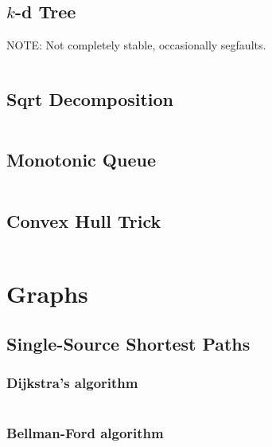 \documentclass[9pt,a4paper,twocolumn,landscape,oneside]{amsart}
\newcommand{\code}[1]{\inputminted{cpp}{_code/#1}}
\newif\ifverbose
\begin{document}
    \subsection{$k$-d Tree}
        \ifverbose
        A $k$-dimensional tree supporting fast construction, adding points, and
        nearest neighbor queries.
        \fi
        NOTE: Not completely stable, occasionally segfaults.
        \code{data-structures/kd_tree.cpp}

    \subsection{Sqrt Decomposition}
        \ifverbose
        Design principle that supports many operations in amortized $\sqrt{n}$ per operation.
        \fi
        \code{data-structures/sqrt_decomposition.cpp}

    \subsection{Monotonic Queue}
        \ifverbose
        A queue that supports querying for the minimum element. Useful for sliding window algorithms.
        \fi
        \code{data-structures/monotonic_queue.cpp}

    \subsection{Convex Hull Trick}
        \code{data-structures/convex_hull_trick.cpp}

\section{Graphs}
    \subsection{Single-Source Shortest Paths}
        \subsubsection{Dijkstra's algorithm}
            \ifverbose
            An implementation of Dijkstra's algorithm. It runs in
            $\Theta(|E|\log{|V|})$ time.
            \fi
            \code{graph/dijkstra.cpp}

        \subsubsection{Bellman-Ford algorithm}
            \ifverbose
            The Bellman-Ford algorithm solves the single-source shortest paths
            problem in $O(|V||E|)$ time. It is slower than Dijkstra's
            algorithm, but it works on graphs with negative edges and has the
            ability to detect negative cycles, neither of which Dijkstra's
            algorithm can do.
            \fi
            \code{graph/bellman_ford.cpp}
\end{document}
